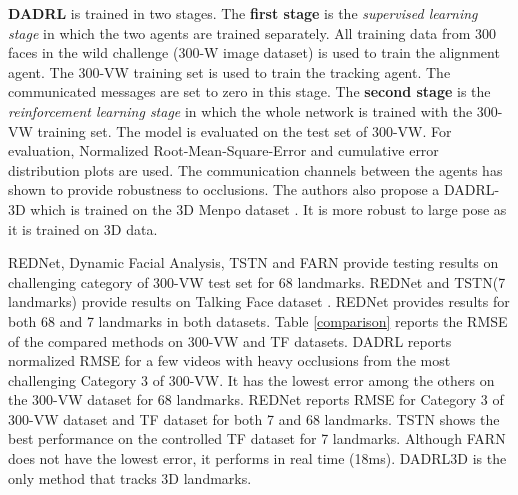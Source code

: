 \documentclass{llncs}
\begin{document}
	\textbf{DADRL} \cite{dadrl} is trained in two stages. The \textbf{first stage} is the \textit{supervised learning stage} in which the two agents are trained separately. All training data from 300 faces in the wild challenge (300-W image dataset) is used to train the alignment agent. The 300-VW training set is used to train the tracking agent. The communicated messages are set to zero in this stage. The \textbf{second stage} is the \textit{reinforcement learning stage} in which the whole network is trained with the 300-VW training set. The model is evaluated on the test set of 300-VW. For evaluation, Normalized Root-Mean-Square-Error and cumulative error distribution plots are used. The communication channels between the agents has shown to provide robustness to occlusions. The authors also propose a DADRL-3D which is trained on the 3D Menpo dataset \cite{3d_menpo}. It is more robust to large pose as it is trained on 3D data.
	

	
	REDNet\cite{rednet}, Dynamic Facial Analysis\cite{dynamic_facial_analysis}, TSTN\cite{tstn} and FARN\cite{farn} provide testing results on challenging category of 300-VW test set for 68 landmarks. REDNet\cite{rednet} and TSTN\cite{tstn}(7 landmarks) provide results on Talking Face dataset \cite{tf}. REDNet\cite{rednet} provides results for both 68 and 7 landmarks in both datasets.
	Table \ref{comparison} reports the RMSE of the compared methods on 300-VW and TF\cite{tf} datasets.
	DADRL\cite{dadrl} reports normalized RMSE for a few videos with heavy occlusions from the most challenging Category 3 of 300-VW. It has the lowest error among the others on the 300-VW dataset for 68 landmarks.
	REDNet\cite{rednet} reports RMSE for Category 3 of 300-VW dataset and TF dataset for both 7 and 68 landmarks. TSTN\cite{tstn} shows the best performance on the controlled TF dataset for 7 landmarks. Although FARN\cite{farn} does not have the lowest error, it performs in real time (18ms). DADRL3D is the only method that tracks 3D landmarks.
	
\end{document}
